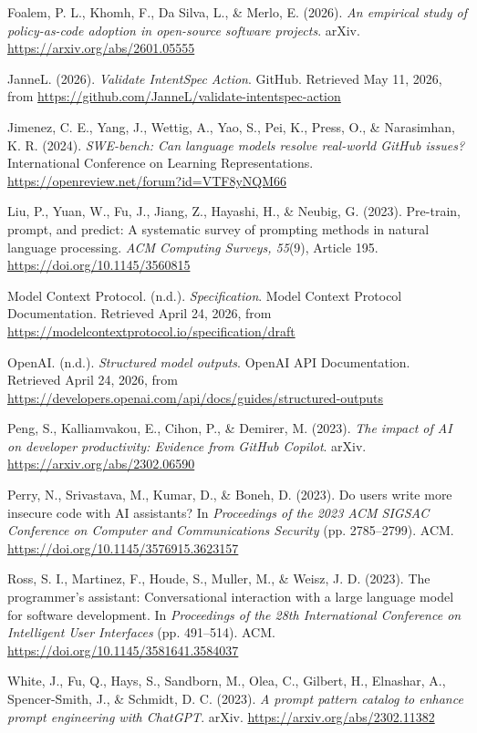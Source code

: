 \documentclass[11pt]{article}
\begin{document}
Foalem, P. L., Khomh, F., Da Silva, L., \& Merlo, E. (2026).
\textit{An empirical study of policy-as-code adoption in open-source software
projects}. arXiv. \url{https://arxiv.org/abs/2601.05555}

JanneL. (2026). \textit{Validate IntentSpec Action}. GitHub. Retrieved May 11,
2026, from \url{https://github.com/JanneL/validate-intentspec-action}

Jimenez, C. E., Yang, J., Wettig, A., Yao, S., Pei, K., Press, O., \&
Narasimhan, K. R. (2024). \textit{SWE-bench: Can language models resolve
real-world GitHub issues?} International Conference on Learning Representations.
\url{https://openreview.net/forum?id=VTF8yNQM66}

Liu, P., Yuan, W., Fu, J., Jiang, Z., Hayashi, H., \& Neubig, G. (2023).
Pre-train, prompt, and predict: A systematic survey of prompting methods in
natural language processing. \textit{ACM Computing Surveys, 55}(9), Article
195. \url{https://doi.org/10.1145/3560815}

Model Context Protocol. (n.d.). \textit{Specification}. Model Context Protocol
Documentation. Retrieved April 24, 2026, from
\url{https://modelcontextprotocol.io/specification/draft}

OpenAI. (n.d.). \textit{Structured model outputs}. OpenAI API Documentation.
Retrieved April 24, 2026, from
\url{https://developers.openai.com/api/docs/guides/structured-outputs}

Peng, S., Kalliamvakou, E., Cihon, P., \& Demirer, M. (2023). \textit{The
impact of AI on developer productivity: Evidence from GitHub Copilot}. arXiv.
\url{https://arxiv.org/abs/2302.06590}

Perry, N., Srivastava, M., Kumar, D., \& Boneh, D. (2023). Do users write more
insecure code with AI assistants? In \textit{Proceedings of the 2023 ACM SIGSAC
Conference on Computer and Communications Security} (pp. 2785--2799). ACM.
\url{https://doi.org/10.1145/3576915.3623157}

Ross, S. I., Martinez, F., Houde, S., Muller, M., \& Weisz, J. D. (2023). The
programmer's assistant: Conversational interaction with a large language model
for software development. In \textit{Proceedings of the 28th International
Conference on Intelligent User Interfaces} (pp. 491--514). ACM.
\url{https://doi.org/10.1145/3581641.3584037}

White, J., Fu, Q., Hays, S., Sandborn, M., Olea, C., Gilbert, H., Elnashar, A.,
Spencer-Smith, J., \& Schmidt, D. C. (2023). \textit{A prompt pattern catalog
to enhance prompt engineering with ChatGPT}. arXiv.
\url{https://arxiv.org/abs/2302.11382}
\end{document}
